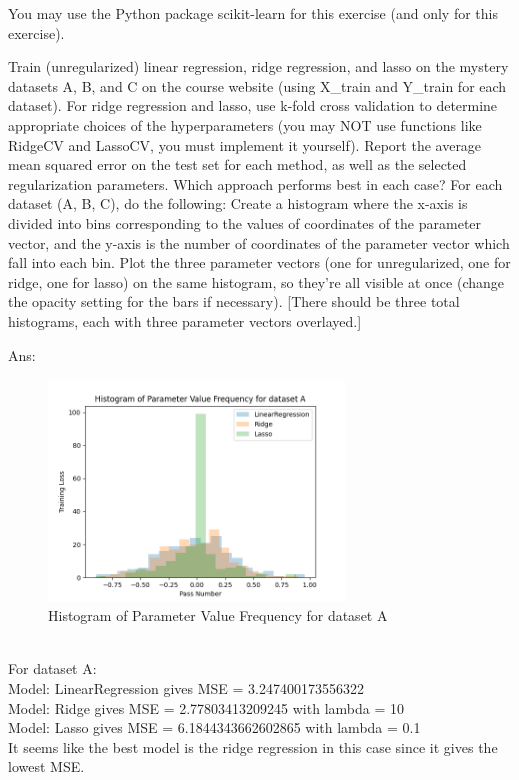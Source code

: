\documentclass[10pt,letter,notitlepage]{article}
\newcommand{\red}[1]{{\color{red}#1}}
\newcommand{\ans}[1]{{\color{orange}\textsf{Ans}: #1}}
\newcounter{exercise}
\begin{document}
\begin{exercise}

  \red{You may use the Python package scikit-learn for this exercise (and only for this exercise).}

Train (unregularized) linear regression, ridge regression, and lasso on the mystery datasets A, B, and C on the course website (using X\_train and Y\_train for each dataset).
For ridge regression and lasso, use k-fold cross validation to determine appropriate choices of the hyperparameters (you may NOT use functions like RidgeCV and LassoCV, you must implement it yourself). 
Report the average mean squared error on the test set for each method, as well as the selected regularization parameters.
Which approach performs best in each case?
For each dataset (A, B, C), do the following:
Create a histogram where the x-axis is divided into bins corresponding to the values of coordinates of the parameter vector, and the y-axis is the number of coordinates of the parameter vector which fall into each bin. 
Plot the three parameter vectors (one for unregularized, one for ridge, one for lasso) on the same histogram, so they're all visible at once (change the opacity setting for the bars if necessary).
  [There should be three total histograms, each with three parameter vectors overlayed.]

  \ans{
    \begin{figure}[H]
    \centering
    \includegraphics[width=0.7\textwidth]{Exercise3_dataset_A.png}
    \caption{Histogram of Parameter Value Frequency for dataset A}
    \end{figure}
    \\
    \color{orange}
    For dataset A:  \\
    Model: LinearRegression gives MSE = 3.247400173556322 \\
    Model: Ridge gives MSE = 2.77803413209245 with lambda = 10 \\
    Model: Lasso gives MSE = 6.1844343662602865 with lambda = 0.1 \\
    It seems like the best model is the ridge regression in this case since it gives the lowest MSE. \\

}
\end{exercise}
\end{document}
